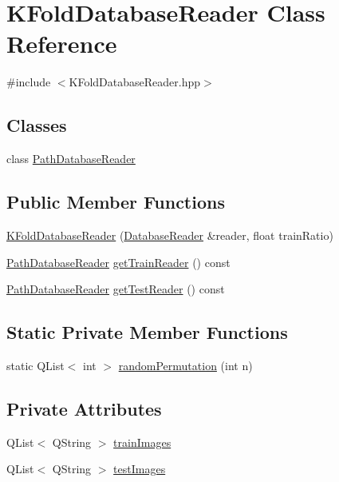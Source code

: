 \hypertarget{class_k_fold_database_reader}{\section{K\+Fold\+Database\+Reader Class Reference}
\label{class_k_fold_database_reader}
}


{\ttfamily \#include $<$K\+Fold\+Database\+Reader.\+hpp$>$}

\subsection*{Classes}
\begin{DoxyCompactItemize}
\item 
class \hyperlink{class_k_fold_database_reader_1_1_path_database_reader}{Path\+Database\+Reader}
\end{DoxyCompactItemize}
\subsection*{Public Member Functions}
\begin{DoxyCompactItemize}
\item 
\hyperlink{class_k_fold_database_reader_a50c775127f0a9decc8d7f275005cd437}{K\+Fold\+Database\+Reader} (\hyperlink{class_database_reader}{Database\+Reader} \&reader, float train\+Ratio)
\item 
\hyperlink{class_k_fold_database_reader_1_1_path_database_reader}{Path\+Database\+Reader} \hyperlink{class_k_fold_database_reader_a2a94b70899a67487649330c72a545e5a}{get\+Train\+Reader} () const 
\item 
\hyperlink{class_k_fold_database_reader_1_1_path_database_reader}{Path\+Database\+Reader} \hyperlink{class_k_fold_database_reader_a5a39e6986d09d77427d98c2ba7a25131}{get\+Test\+Reader} () const 
\end{DoxyCompactItemize}
\subsection*{Static Private Member Functions}
\begin{DoxyCompactItemize}
\item 
static Q\+List$<$ int $>$ \hyperlink{class_k_fold_database_reader_a2f8223aae421c533d260b5d6e65c09e8}{random\+Permutation} (int n)
\end{DoxyCompactItemize}
\subsection*{Private Attributes}
\begin{DoxyCompactItemize}
\item 
Q\+List$<$ Q\+String $>$ \hyperlink{class_k_fold_database_reader_a93461f0d927f76d6dad7af885e16b172}{train\+Images}
\item 
Q\+List$<$ Q\+String $>$ \hyperlink{class_k_fold_database_reader_a224507fbe965e1fb12089fb572d72681}{test\+Images}
\end{DoxyCompactItemize}


